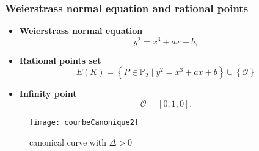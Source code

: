 \begin{frame}[t]
    \frametitle{Weierstrass normal equation and rational points}
    \begin{minipage}[t]{0.48\linewidth}
        
        \begin{itemize}
        \item \textbf{Weierstrass normal equation}
       \[
       y^2=x^3+ax+b
       ,\] 
       \item \textbf{Rational points set}
       \[
    E(K) = \left\{ P \in \mathbb{P}_{2} \mid y^2 = x^3 + ax + b \right\} \cup \left\{
       \mathcal{O} \right\}  
       \] 
       \item \textbf{Infinity point}
       \[
       \mathcal{O} = [0,1,0]
       .\] 
        \end{itemize}

    \end{minipage}%
    \hfill%
    \begin{minipage}[t]{0.48\linewidth}
       \begin{figure}[h]
           \centering
           \texttt{[image: courbeCanonique2]}
           \caption{canonical curve with $\Delta > 0$}
           \label{fig:courbeCanonique2}
       \end{figure} 
    \end{minipage}
\end{frame}
